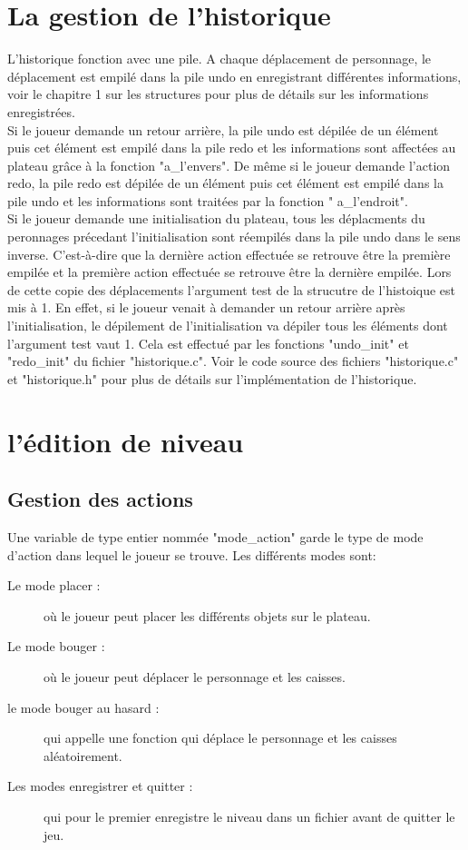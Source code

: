 \documentclass{report}
\begin{document}
	\chapter{La gestion de l'historique}
L'historique fonction avec une pile. A chaque déplacement de personnage, le déplacement est empilé dans la pile undo en enregistrant différentes informations, voir le chapitre 1 sur les structures pour plus de détails sur les informations enregistrées.\\
Si le joueur demande un retour arrière, la pile undo est dépilée de un élément puis cet élément est empilé dans la pile redo et les informations sont affectées au plateau grâce à la fonction "a\_l'envers".
De même si le joueur demande l'action redo, la pile redo est dépilée de un élément puis cet élément est empilé dans la pile undo et les informations sont traitées par la fonction " a\_l'endroit".\\
Si le joueur demande une initialisation du plateau, tous les déplacments du peronnages précedant l'initialisation sont réempilés dans la pile undo dans le sens inverse. C'est-à-dire que la dernière action effectuée se retrouve être la première empilée et la première action effectuée se retrouve être la dernière empilée.
Lors de cette copie des déplacements l'argument test de la strucutre de l'histoique est mis à 1.
En effet, si le joueur venait à demander un retour arrière après l'initialisation, le dépilement de l'initialisation va dépiler tous les éléments dont l'argument test vaut 1. Cela est effectué par les fonctions "undo\_init" et "redo\_init" du fichier "historique.c".
Voir le code source des fichiers "historique.c" et "historique.h" pour plus de détails sur l'implémentation de l'historique.
	
	\chapter{l'édition de niveau}
		\section{Gestion des actions}
Une variable de type entier nommée "mode\_action" garde le type de mode d'action dans lequel le joueur se trouve. Les différents modes sont:
\begin{description}
\item[Le mode placer :]où le joueur peut placer les différents objets sur le plateau.
\item[Le mode bouger :]où le joueur peut déplacer le personnage et les caisses.
\item[le mode bouger au hasard :]qui appelle une fonction qui déplace le personnage et les caisses aléatoirement.
\item[Les modes enregistrer et quitter :] qui pour le premier enregistre le niveau dans un fichier avant de quitter le jeu.
\end{description}
\end{document}
